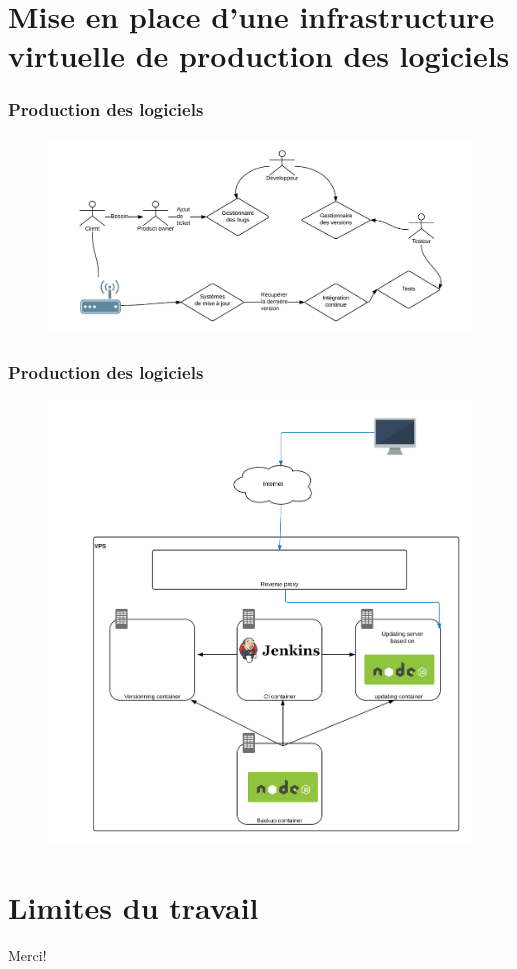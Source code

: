 \documentclass{beamer}
\begin{document}
\section{Mise en place d'une infrastructure virtuelle de production des logiciels}
\begin{frame}
\frametitle{Production des logiciels}
\begin{figure}
\centering
\includegraphics[scale=0.6]{images/fig3.png}
\end{figure}
\end{frame}

\begin{frame}
\frametitle{Production des logiciels}
\begin{figure}
\centering
\includegraphics[scale=0.3]{images/vps1.png}
\end{figure}
\end{frame}

\section{Limites du travail}






\begin{frame}
\Huge{\centerline{Merci!}}
\end{frame}

\end{document}
